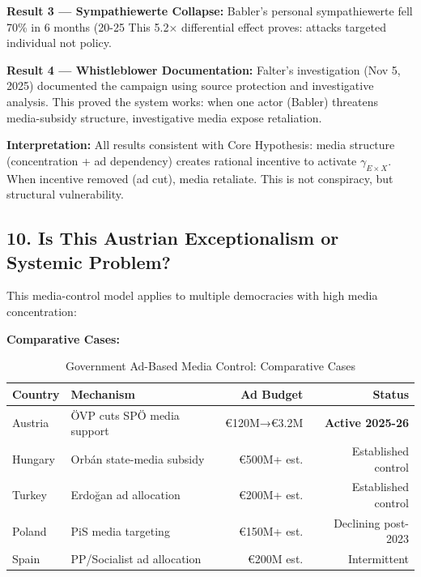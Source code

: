 \textbf{Result 3 — Sympathiewerte Collapse:} Babler's personal sympathiewerte fell
70\% in 6 months (20-25%
This 5.2× differential effect proves: attacks targeted individual not policy.

\textbf{Result 4 — Whistleblower Documentation:} Falter's investigation (Nov 5, 2025)
documented the campaign using source protection and investigative analysis. This
proved the system works: when one actor (Babler) threatens media-subsidy structure,
investigative media expose retaliation.

\textbf{Interpretation:} All results consistent with Core Hypothesis: media
structure (concentration + ad dependency) creates rational incentive to activate
$\gamma_{E \times X}$. When incentive removed (ad cut), media retaliate. This is
not conspiracy, but structural vulnerability.

\label{sec:dx-generalization}

\subsection*{10. Is This Austrian Exceptionalism or Systemic Problem?}

This media-control model applies to multiple democracies with high media concentration:

\textbf{Comparative Cases:}

\begin{table}[h]
\centering
\caption{Government Ad-Based Media Control: Comparative Cases}
\label{tab:dx-comparative}
\begin{tabular}{|l|l|r|r|}
\hline
\textbf{Country} & \textbf{Mechanism} & \textbf{Ad Budget} & \textbf{Status} \\
\hline
Austria & ÖVP cuts SPÖ media support & €120M→€3.2M & \textbf{Active 2025-26} \\
Hungary & Orbán state-media subsidy & €500M+ est. & Established control \\
Turkey & Erdoğan ad allocation & €200M+ est. & Established control \\
Poland & PiS media targeting & €150M+ est. & Declining post-2023 \\
Spain & PP/Socialist ad allocation & €200M est. & Intermittent \\
\hline
\end{tabular}
\end{table}

